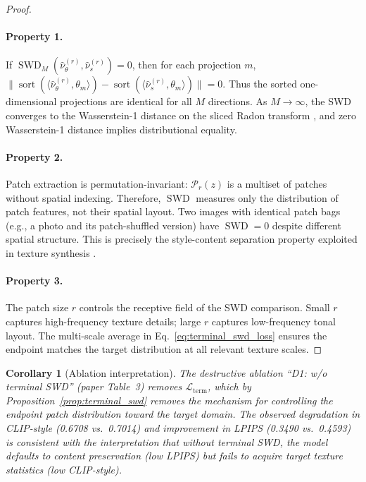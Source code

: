 \documentclass[letterpaper]{article}
\newtheorem{corollary}[proposition]{Corollary}
\newcommand{\SWD}{\operatorname{SWD}}
\newcommand{\cL}{\mathcal{L}}
\newcommand{\sort}{\operatorname{sort}}
\begin{document}
\begin{proof}
\paragraph{Property 1.}
If $\SWD_M(\hat\nu_\theta^{(r)}, \hat\nu_s^{(r)}) = 0$,
then for each projection $m$, $\|\sort(\langle\hat\nu_\theta^{(r)},\theta_m\rangle) - \sort(\langle\hat\nu_s^{(r)},\theta_m\rangle)\| = 0$.
Thus the sorted one-dimensional projections are identical for all $M$
directions. As $M \to \infty$, the SWD converges to the Wasserstein-1
distance on the sliced Radon transform \cite{bonnotte2013non}, and zero
Wasserstein-1 distance implies distributional equality.

\paragraph{Property 2.}
Patch extraction is permutation-invariant: $\mathcal{P}_r(z)$ is a
multiset of patches without spatial indexing. Therefore, $\SWD$
measures only the distribution of patch features, not their spatial
layout. Two images with identical patch bags (e.g., a photo and its
patch-shuffled version) have $\SWD = 0$ despite different spatial
structure. This is precisely the style-content separation property
exploited in texture synthesis \cite{julesz1981textons}.

\paragraph{Property 3.}
The patch size $r$ controls the receptive field of the SWD comparison.
Small $r$ captures high-frequency texture details; large $r$ captures
low-frequency tonal layout. The multi-scale average in Eq.~\eqref{eq:terminal_swd_loss}
ensures the endpoint matches the target distribution at all relevant
texture scales.
\end{proof}

\begin{corollary}[Ablation interpretation]
\label{cor:ablation_terminal}
The destructive ablation ``D1: w/o terminal SWD'' (paper Table~3) removes
$\cL_{\text{term}}$, which by Proposition~\ref{prop:terminal_swd} removes
the mechanism for controlling the endpoint patch distribution toward the
target domain. The observed degradation in CLIP-style (0.6708 vs.\ 0.7014)
and improvement in LPIPS (0.3490 vs.\ 0.4593) is consistent with the
interpretation that without terminal SWD, the model defaults to content
preservation (low LPIPS) but fails to acquire target texture statistics
(low CLIP-style).
\end{corollary}
\end{document}

